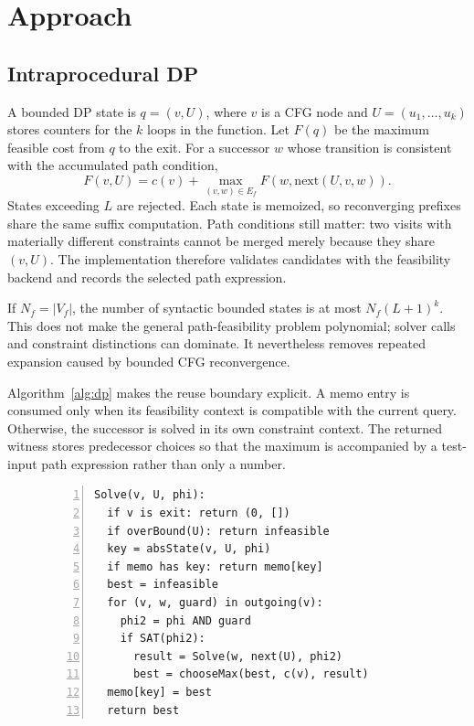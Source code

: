 \documentclass[10pt,conference]{IEEEtran}
\begin{document}
\section{Approach}
\subsection{Intraprocedural DP}
A bounded DP state is $q=(v,U)$, where $v$ is a CFG node and $U=(u_1,\ldots,u_k)$ stores counters for the $k$ loops in the function. Let $F(q)$ be the maximum feasible cost from $q$ to the exit. For a successor $w$ whose transition is consistent with the accumulated path condition,
\begin{equation}
F(v,U)=c(v)+\max_{(v,w)\in E_f}F(w,\mathrm{next}(U,v,w)).
\end{equation}
States exceeding $L$ are rejected. Each state is memoized, so reconverging prefixes share the same suffix computation. Path conditions still matter: two visits with materially different constraints cannot be merged merely because they share $(v,U)$. The implementation therefore validates candidates with the feasibility backend and records the selected path expression.

If $N_f=|V_f|$, the number of syntactic bounded states is at most $N_f(L+1)^k$. This does not make the general path-feasibility problem polynomial; solver calls and constraint distinctions can dominate. It nevertheless removes repeated expansion caused by bounded CFG reconvergence.

Algorithm~\ref{alg:dp} makes the reuse boundary explicit. A memo entry is consumed only when its feasibility context is compatible with the current query. Otherwise, the successor is solved in its own constraint context. The returned witness stores predecessor choices so that the maximum is accompanied by a test-input path expression rather than only a number.

\begin{figure}[t]
\small
\begin{lstlisting}[numbers=left,frame=single,caption={Bounded maximal-cost DP (schematic).},label={alg:dp}]
Solve(v, U, phi):
  if v is exit: return (0, [])
  if overBound(U): return infeasible
  key = absState(v, U, phi)
  if memo has key: return memo[key]
  best = infeasible
  for (v, w, guard) in outgoing(v):
    phi2 = phi AND guard
    if SAT(phi2):
      result = Solve(w, next(U), phi2)
      best = chooseMax(best, c(v), result)
  memo[key] = best
  return best
\end{lstlisting}
\end{figure}
\end{document}
